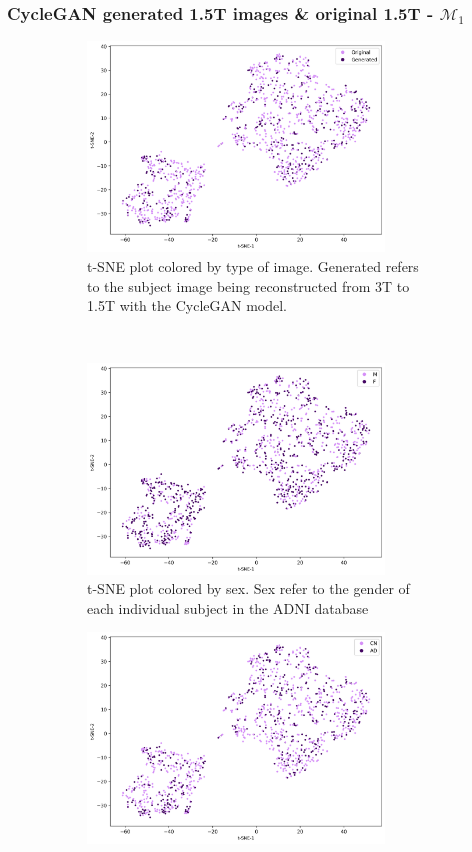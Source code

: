 \documentclass[11pt, fleqn, titlepage]{article}
\newcommand{\1}[1]{\mathds{1}\left[#1\right]}
\begin{document}
\subsubsection{CycleGAN generated 1.5T images \& original 1.5T -  $ \mathcal M_1 $}
\vspace*{-0.65cm}
\begin{figure}[H]
	\centering
	\begin{subfigure}[t]{0.62\textwidth}
		\centering
		\includegraphics[height=2.2in]{imgs/classifier/with_generated_imgs_tsne_type}%
		\caption{t-SNE plot colored by type of image. Generated refers to the subject image being reconstructed from 3T to 1.5T with the CycleGAN model.}
	\end{subfigure}%
	~
	\begin{subfigure}[t]{0.5\textwidth}
		\centering
		\includegraphics[height=2.2in]{imgs/classifier/with_generated_imgs_tsne_sex}%
		\caption{t-SNE plot colored by sex. Sex refer to the gender of each individual subject in the ADNI database}	
	\end{subfigure}
	\begin{subfigure}[t]{0.5\textwidth}
		\centering
		\includegraphics[height=2.2in]{imgs/classifier/with_generated_imgs_tsne_group}%

\end{subfigure}
\end{figure}
\end{document}
